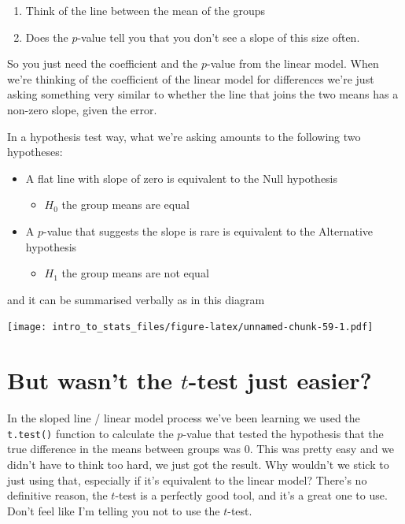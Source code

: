 \documentclass[
]{book}
\providecommand{\tightlist}{%
  \setlength{\itemsep}{0pt}\setlength{\parskip}{0pt}}
\begin{document}
\begin{enumerate}
\def\labelenumi{\arabic{enumi}.}
\tightlist
\item
  Think of the line between the mean of the groups
\item
  Does the \(p\)-value tell you that you don't see a slope of this size often.
\end{enumerate}

So you just need the coefficient and the \(p\)-value from the linear model.
When we're thinking of the coefficient of the linear model for differences we're just asking something very similar to whether the line that joins the two means has a non-zero slope, given the error.

In a hypothesis test way, what we're asking amounts to the following two hypotheses:

\begin{itemize}
\tightlist
\item
  A flat line with slope of zero is equivalent to the Null hypothesis

  \begin{itemize}
  \tightlist
  \item
    \(H_{0}\) the group means are equal
  \end{itemize}
\item
  A \(p\)-value that suggests the slope is rare is equivalent to the Alternative hypothesis

  \begin{itemize}
  \tightlist
  \item
    \(H_{1}\) the group means are not equal
  \end{itemize}
\end{itemize}

and it can be summarised verbally as in this diagram

\texttt{[image: intro\_to\_stats\_files/figure-latex/unnamed-chunk-59-1.pdf]}

\hypertarget{but-wasnt-the-t-test-just-easier}{%
\section{\texorpdfstring{But wasn't the \(t\)-test just easier?}{But wasn't the t-test just easier?}}\label{but-wasnt-the-t-test-just-easier}}

In the sloped line / linear model process we've been learning we used the \texttt{t.test()} function to calculate the \(p\)-value that tested the hypothesis that the true difference in the means between groups was 0. This was pretty easy and we didn't have to think too hard, we just got the result. Why wouldn't we stick to just using that, especially if it's equivalent to the linear model? There's no definitive reason, the \(t\)-test is a perfectly good tool, and it's a great one to use. Don't feel like I'm telling you not to use the \(t\)-test.
\end{document}
